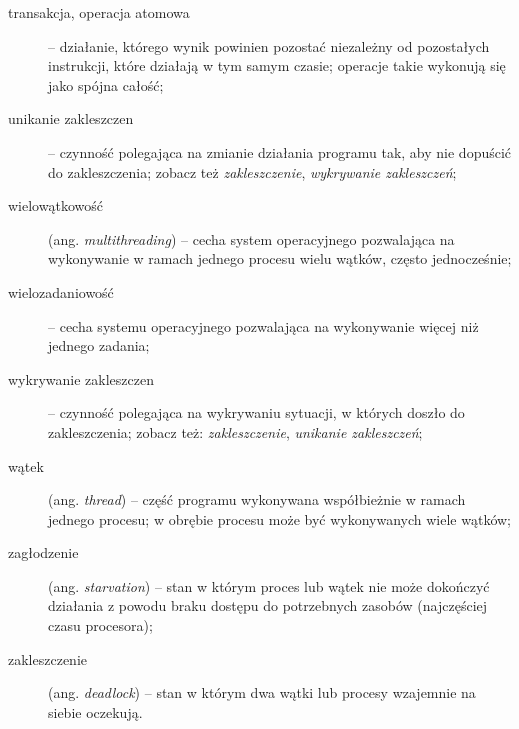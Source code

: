 \documentclass{documentation}
\begin{document}
\begin{description}
\newpage
    \item[transakcja, operacja atomowa] -- działanie, którego wynik powinien pozostać niezależny od pozostałych instrukcji, które działają w tym samym czasie; operacje takie wykonują się jako spójna całość; \\
    \item[unikanie zakleszczen] -- czynność polegająca na zmianie działania programu tak, aby nie dopuścić do zakleszczenia; zobacz też \emph{zakleszczenie}, \emph{wykrywanie zakleszczeń};\\
    \item[wielowątkowość] (ang. \emph{multithreading}) -- cecha system operacyjnego pozwalająca na wykonywanie w ramach jednego procesu wielu wątków, często jednocześnie;\\
    \item[wielozadaniowość] -- cecha systemu operacyjnego pozwalająca na wykonywanie więcej niż jednego zadania;\\
    \item[wykrywanie zakleszczen] -- czynność polegająca na wykrywaniu sytuacji, w których doszło do zakleszczenia; zobacz też: \emph{zakleszczenie}, \emph{unikanie zakleszczeń};\\
    \item[wątek] (ang. \emph{thread}) -- część programu wykonywana współbieżnie w ramach jednego procesu; w obrębie procesu może być wykonywanych wiele wątków;\\
    \item[zagłodzenie] (ang. \emph{starvation}) -- stan w którym proces lub wątek nie może dokończyć działania z powodu braku dostępu do potrzebnych zasobów (najczęściej czasu procesora);\\
    \item[zakleszczenie] (ang. \emph{deadlock}) -- stan w którym dwa wątki lub procesy wzajemnie na siebie oczekują.\\
\end{description}
\end{document}
